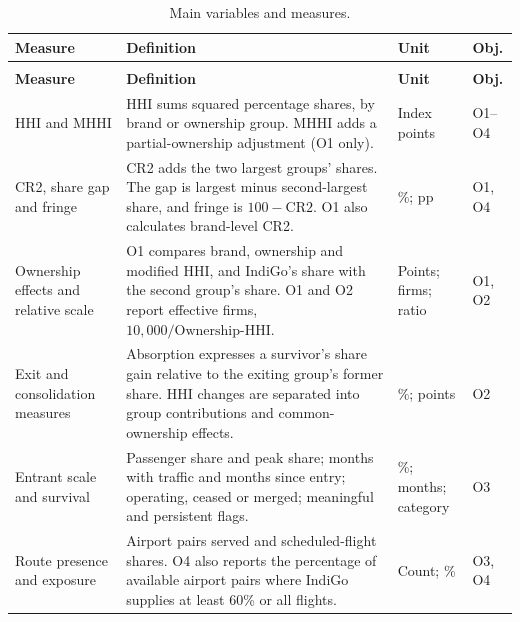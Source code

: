 \begingroup
\color{black}\small{}
\renewcommand{\arraystretch}{1.2}
\setlength{\tabcolsep}{5pt}
\captionsetup{font=small,labelfont=bf,justification=centering,singlelinecheck=false,skip=6pt}
\begin{longtable}{|>{\raggedright\arraybackslash}p{}|>{\raggedright\arraybackslash}p{}|>{\raggedright\arraybackslash}p{}|>{\raggedright\arraybackslash}p{}|}
\caption{Main variables and measures.}\label{tab:variables-summary}\\
\hline
\textbf{Measure} & \textbf{Definition} & \textbf{Unit} & \textbf{Obj.} \\
\hline
\endfirsthead
\multicolumn{4}{c}{\small Table~\thetable\ (continued)}\\[4pt]
\hline
\textbf{Measure} & \textbf{Definition} & \textbf{Unit} & \textbf{Obj.} \\
\hline
\endhead
HHI and MHHI & HHI sums squared percentage shares, by brand or ownership group. MHHI adds a partial-ownership adjustment (O1 only). & Index points & O1--O4 \\
\hline
CR2, share gap and fringe & CR2 adds the two largest groups' shares. The gap is largest minus second-largest share, and fringe is $100-\mathrm{CR2}$. O1 also calculates brand-level CR2. & \%; pp & O1, O4 \\
\hline
Ownership effects and relative scale & O1 compares brand, ownership and modified HHI, and IndiGo's share with the second group's share. O1 and O2 report effective firms, $10{,}000/\mathrm{Ownership\mbox{-}HHI}$. & Points; firms; ratio & O1, O2 \\
\hline
Exit and consolidation measures & Absorption expresses a survivor's share gain relative to the exiting group's former share. HHI changes are separated into group contributions and common-ownership effects. & \%; points & O2 \\
\hline
Entrant scale and survival & Passenger share and peak share; months with traffic and months since entry; operating, ceased or merged; meaningful and persistent flags. & \%; months; category & O3 \\
\hline
Route presence and exposure & Airport pairs served and scheduled-flight shares. O4 also reports the percentage of available airport pairs where IndiGo supplies at least 60\% or all flights. & Count; \% & O3, O4 \\

\end{longtable}

